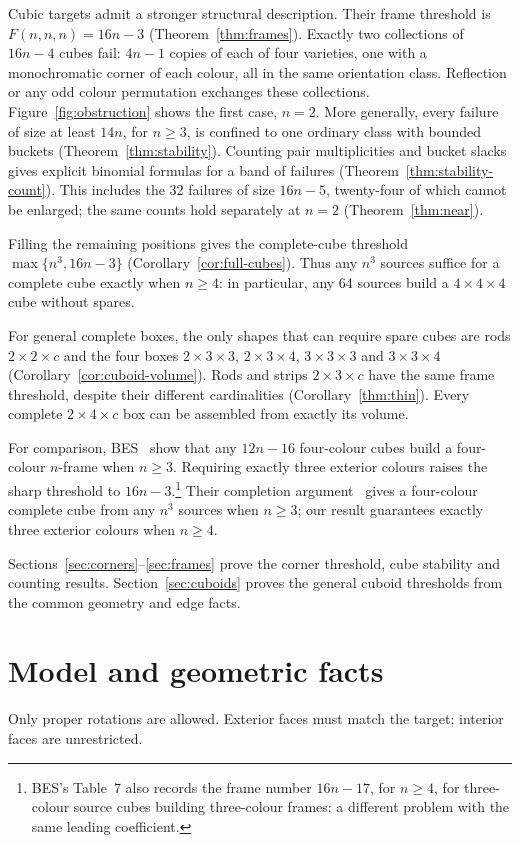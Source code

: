 \documentclass[11pt]{article}
\theoremstyle{remark}
\begin{document}
Cubic targets admit a stronger structural description. Their frame
threshold is $F(n,n,n)=16n-3$ (Theorem~\ref{thm:frames}). Exactly two collections of
$16n-4$ cubes fail: $4n-1$ copies of each of four varieties, one with a
monochromatic corner of each colour, all in the same orientation class.
Reflection or any odd colour permutation exchanges these collections.
Figure~\ref{fig:obstruction} shows the first case, $n=2$.
More generally, every failure of size at least $14n$, for $n\ge3$, is
confined to one ordinary class with bounded buckets
(Theorem~\ref{thm:stability}). Counting pair multiplicities and bucket
slacks gives explicit binomial formulas for a band of failures
(Theorem~\ref{thm:stability-count}). This includes the 32 failures of size
$16n-5$, twenty-four of which cannot be enlarged; the same counts hold
separately at $n=2$ (Theorem~\ref{thm:near}).

Filling the remaining positions gives the complete-cube threshold
$\max\{n^3,16n-3\}$ (Corollary~\ref{cor:full-cubes}). Thus any $n^3$
sources suffice for a complete cube exactly when $n\ge4$: in particular,
any 64 sources build a $4\times4\times4$ cube without spares.

For general complete boxes, the only shapes that can require spare cubes
are rods $2\times2\times c$ and the four boxes
$2\times3\times3$, $2\times3\times4$, $3\times3\times3$ and
$3\times3\times4$ (Corollary~\ref{cor:cuboid-volume}). Rods and strips
$2\times3\times c$ have the same frame threshold, despite their different
cardinalities (Corollary~\ref{thm:thin}). Every complete $2\times4\times c$
box can be assembled from exactly its volume.

For comparison, BES~\cite[Theorem 5]{BES} show that any $12n-16$
four-colour cubes build a four-colour $n$-frame when $n\ge3$. Requiring
exactly three exterior colours raises the sharp threshold to
$16n-3$.\footnote{BES's Table~7 also records the frame number $16n-17$, for
$n\ge4$, for three-colour source cubes building three-colour frames: a
different problem with the same leading coefficient.} Their completion
argument~\cite[Section 1]{BES} gives a four-colour complete cube from any
$n^3$ sources when $n\ge3$; our result guarantees exactly three exterior
colours when $n\ge4$.

Sections~\ref{sec:corners}--\ref{sec:frames} prove the corner threshold,
cube stability and counting results. Section~\ref{sec:cuboids} proves the
general cuboid thresholds from the common geometry and edge facts.

\section{Model and geometric facts}\label{sec:geometry}
Only proper rotations are allowed. Exterior faces must match the target;
interior faces are unrestricted.
\end{document}
